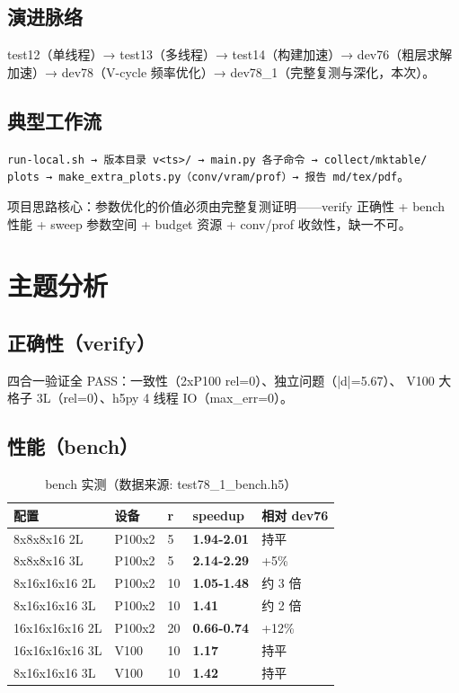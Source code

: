 \documentclass[UTF8]{ctexart}
\begin{document}
\subsection{演进脉络}
test12（单线程）→ test13（多线程）→ test14（构建加速）→ dev76（粗层求解
加速）→ dev78（V-cycle 频率优化）→ dev78\_1（完整复测与深化，本次）。
\subsection{典型工作流}
\texttt{run-local.sh → 版本目录 v<ts>/ → main.py 各子命令 → collect/mktable/
plots → make\_extra\_plots.py（conv/vram/prof）→ 报告 md/tex/pdf}。

\begin{ideabox}
项目思路核心：参数优化的价值必须由完整复测证明——verify 正确性 +
bench 性能 + sweep 参数空间 + budget 资源 + conv/prof 收敛性，缺一不可。
\end{ideabox}

\section{主题分析}
\subsection{正确性（verify）}
四合一验证全 PASS：一致性（2xP100 rel=0）、独立问题（|d|=5.67）、
V100 大格子 3L（rel=0）、h5py 4 线程 IO（max\_err=0）。

\subsection{性能（bench）}
\begin{table}[htbp]\centering
\begin{tabular}{lllll}
\toprule
配置 & 设备 & r & speedup & 相对 dev76 \\
\midrule
8x8x8x16 2L & P100x2 & 5 & \textbf{1.94-2.01} & 持平 \\
8x8x8x16 3L & P100x2 & 5 & \textbf{2.14-2.29} & +5\% \\
8x16x16x16 2L & P100x2 & 10 & \textbf{1.05-1.48} & 约 3 倍 \\
8x16x16x16 3L & P100x2 & 10 & \textbf{1.41} & 约 2 倍 \\
16x16x16x16 2L & P100x2 & 20 & \textbf{0.66-0.74} & +12\% \\
16x16x16x16 3L & V100 & 10 & \textbf{1.17} & 持平 \\
8x16x16x16 3L & V100 & 10 & \textbf{1.42} & 持平 \\
\bottomrule
\end{tabular}
\caption{bench 实测（数据来源: test78\_1\_bench.h5）}
\end{table}
\end{document}
